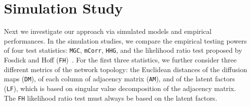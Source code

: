 \documentclass[11pt]{article}
\theoremstyle{definition}
\newtheorem{theorem}{Theorem}[section]
\newcommand{\cs}[1]{\textcolor{blue}{cs: #1}}
\begin{document}
	
	
	
	\section{Simulation Study}
	\label{sec:simulation}
	\vspace*{-0.2cm}
	Next we investigate our approach via simulated models and empirical performances. In the simulation studies, we compare the empirical testing powers of four test statistics: \texttt{MGC}, \texttt{mCorr}, \texttt{HHG}, and the likelihood ratio test proposed by Fosdick and Hoff (\texttt{FH})~\cite{fosdick2015testing}. For the first three statistics, we further consider three different metrics of the network topology: the Euclidean distances of the diffusion maps (\texttt{DM}), of each column of adjacency matrix (\texttt{AM}), and of the latent factors (\texttt{LF}), which is based on singular value decomposition of the adjacency matrix. The \texttt{FH} likelihood ratio test must always be based on the latent factors.
	
\end{document}
